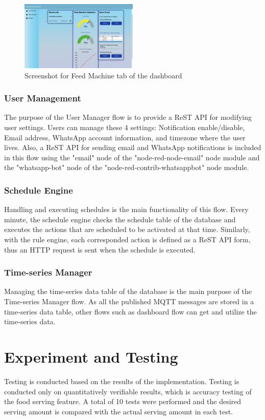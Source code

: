 \documentclass[conference]{IEEEtran}
\begin{document}
\begin{figure}[htbp]
\centerline{\includegraphics[width=0.5\textwidth]{./images/feed_machine_ui.png}}
\caption{Screenshot for Feed Machine tab of the dashboard}
\label{fig}
\end{figure}

\subsubsection{User Management}
The purpose of the User Manager flow is to provide a ReST API for modifying user settings.
Users can manage these 4 settings: Notification enable/disable, Email address, WhatsApp account information, and timezone where the user lives.
Also, a ReST API for sending email and WhatsApp notifications is included in this flow using the "email" node of the "node-red-node-email" node module and the "whatsapp-bot" node of the "node-red-contrib-whatsappbot" node module.

\subsubsection{Schedule Engine}
Handling and executing schedules is the main functionality of this flow.
Every minute, the schedule engine checks the schedule table of the database and executes the actions that are scheduled to be activated at that time.
Similarly, with the rule engine, each corresponded action is defined as a ReST API form, thus an HTTP request is sent when the schedule is executed.

\subsubsection{Time-series Manager}
Managing the time-series data table of the database is the main purpose of the Time-series Manager flow.
As all the published MQTT messages are stored in a time-series data table, other flows such as dashboard flow can get and utilize the time-series data.

\section{Experiment and Testing}
Testing is conducted based on the results of the implementation.
Testing is conducted only on quantitatively verifiable results, which is accuracy testing of the food serving feature.
A total of 10 tests were performed and the desired serving amount is compared with the actual serving amount in each test.
\end{document}
